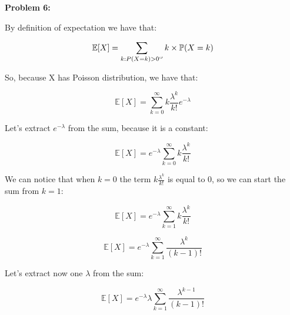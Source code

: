 \textbf{Problem 6:}

\singlespacing

By definition of expectation we have that:

\singlespacing

\begin{equation}
    \mathbb{E}[X] = \sum_{k: P(X = k) >0`'} k \times \mathbb{P}(X = k)
\end{equation}

\singlespacing

So, because X has Poisson distribution, we have that:

\singlespacing

\begin{equation}
    \mathbb{E}[X] = \sum_{k=0}^{\infty} k \frac{\lambda^k}{k!}e^{-\lambda}
\end{equation}

\singlespacing

Let's extract $e^{-\lambda}$ from the sum, because it is a constant:

\singlespacing

\begin{equation}
    \mathbb{E}[X] = e^{-\lambda} \sum_{k=0}^{\infty} k \frac{\lambda^k}{k!}
\end{equation}

\singlespacing

We can notice that when $k = 0$ the term $k \frac{\lambda^k}{k!}$ is equal to $0$,
so we can start the sum from $k = 1$:

\singlespacing

\begin{equation}
    \mathbb{E}[X] = e^{-\lambda} \sum_{k=1}^{\infty} k \frac{\lambda^k}{k!}
\end{equation}

\singlespacing

\begin{equation}
    \mathbb{E}[X] = e^{-\lambda} \sum_{k=1}^{\infty} \frac{\lambda^k}{(k-1)!}
\end{equation}

\singlespacing

Let's extract now one $\lambda$ from the sum:

\singlespacing

\begin{equation}
    \mathbb{E}[X] = e^{-\lambda} \lambda \sum_{k=1}^{\infty} \frac{\lambda^{k-1}}{(k-1)!}
\end{equation}

\singlespacing

